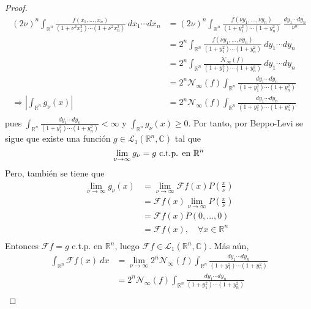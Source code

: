 \documentclass[12pt]{report}
\theoremstyle{largebreak}
\renewcommand{\geq}{\ensuremath{\geqslant}}
\newcommand\abs[1]{\ensuremath{\left|#1\right|}}
\newcommand{\N}[2]{\ensuremath{\mathcal{N}_{#1}\left(#2\right)}}
\newcommand{\fou}[1]{\ensuremath{\mathcal{F}#1}}
\begin{document}
\begin{proof}
        \begin{equation*}
            \begin{split}
                (2\nu)^n\int_{\mathbb{R}^n}\frac{f(x_1,...,x_n)}{(1+\nu^2x_1^2)\cdots(1+\nu^2x_n^2)}\:dx_1\cdots dx_n&=(2\nu)^n\int_{\mathbb{R}^n}\frac{f(\nu y_1,...,\nu y_n)}{(1+y_1^2)\cdots(1+y_n^2)}\: \frac{dy_1\cdots dy_n}{\nu^n}\\
                &=2^n\int_{\mathbb{R}^n}\frac{f(\nu y_1,...,\nu y_n)}{(1+y_1^2)\cdots(1+y_n^2)}\:dy_1\cdots dy_n\\
                &=2^n\int_{\mathbb{R}^n}\frac{\N{\infty}{f}}{(1+y_1^2)\cdots(1+y_n^2)}\:dy_1\cdots dy_n\\
                &=2^n\N{\infty}{f}\int_{\mathbb{R}^n}\frac{dy_1\cdots dy_n}{(1+y_1^2)\cdots(1+y_n^2)}\\
                \Rightarrow \abs{\int_{\mathbb{R}^n}g_\nu(x)}&=2^n\N{\infty}{f}\int_{\mathbb{R}^n}\frac{dy_1\cdots dy_n}{(1+y_1^2)\cdots(1+y_n^2)}\\
            \end{split}
        \end{equation*}
        pues $\int_{\mathbb{R}^n}\frac{dy_1\cdots dy_n}{(1+y_1^2)\cdots(1+y_n^2)}<\infty$ y $\int_{\mathbb{R}^n}g_\nu(x)\geq0$. Por tanto, por Beppo-Levi se sigue que existe una función $g\in\mathcal{L}_1(\mathbb{R}^n,\mathbb{C})$ tal que
        \begin{equation*}
            \lim_{\nu\rightarrow\infty}g_\nu=g\textup{ c.t.p. en }\mathbb{R}^n
        \end{equation*}
        Pero, también se tiene que
        \begin{equation*}
            \begin{split}
                \lim_{\nu\rightarrow\infty}g_\nu(x)&=\lim_{\nu\rightarrow\infty}\fou{f}(x)P\left(\frac{x}{\nu}\right)\\
                &=\fou{f}(x)\lim_{\nu\rightarrow\infty}P\left(\frac{x}{\nu}\right)\\
                &=\fou{f}(x)P\left(0,...,0\right)\\
                &=\fou{f}(x),\quad\forall x\in\mathbb{R}^n \\
            \end{split}
        \end{equation*}
        Entonces $\fou{f}=g$ c.t.p. en $\mathbb{R}^n$, luego $\fou{f}\in\mathcal{L}_1(\mathbb{R}^n,\mathbb{C})$. Más aún,
        \begin{equation*}
            \begin{split}
                \int_{\mathbb{R}^n}\fou{f}(x)\:dx&=\lim_{\nu\rightarrow\infty}2^n\N{\infty}{f}\int_{\mathbb{R}^n}\frac{dy_1\cdots dy_n}{(1+y_1^2)\cdots(1+y_n^2)}\\
                &=2^n\N{\infty}{f}\int_{\mathbb{R}^n}\frac{dy_1\cdots dy_n}{(1+y_1^2)\cdots(1+y_n^2)}\\
            \end{split}
        \end{equation*}
    \end{proof}
\end{document}

